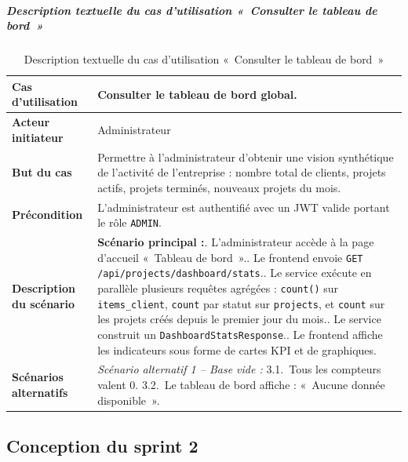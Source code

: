 \subparagraph{Description textuelle du cas d'utilisation «~Consulter le tableau de bord~»}

\begin{table}[H]
  \caption{Description textuelle du cas d'utilisation «~Consulter le tableau de bord~»}
  \label{tab:cu-dashboard}
  \centering
  \begin{tabularx}{\textwidth}{|L{3.8cm}|X|}
    \hline
    \textbf{Cas d'utilisation} & Consulter le tableau de bord global. \\
    \hline
    \textbf{Acteur initiateur} & Administrateur \\
    \hline
    \textbf{But du cas} & Permettre à l'administrateur d'obtenir une vision synthétique de l'activité de l'entreprise : nombre total de clients, projets actifs, projets terminés, nouveaux projets du mois. \\
    \hline
    \textbf{Précondition} & L'administrateur est authentifié avec un JWT valide portant le rôle \texttt{ADMIN}. \\
    \hline
    \textbf{Description du scénario} &
    \textbf{Scénario principal :}. L'administrateur accède à la page d'accueil «~Tableau de bord~».. Le frontend envoie \texttt{GET /api/projects/dashboard/stats}.. Le service exécute en parallèle plusieurs requêtes agrégées :
    \texttt{count()} sur \texttt{items\_client}, \texttt{count} par statut sur \texttt{projects}, et \texttt{count} sur les projets créés depuis le premier jour du mois.. Le service construit un \texttt{DashboardStatsResponse}.. Le frontend affiche les indicateurs sous forme de cartes KPI et de graphiques.\\
    \hline
    \textbf{Scénarios alternatifs} &
    \textit{Scénario alternatif 1 -- Base vide :}\newline
    \hspace*{6pt}3.1.~Tous les compteurs valent 0.\newline
    \hspace*{6pt}3.2.~Le tableau de bord affiche : «~Aucune donnée disponible~».\\
    \hline
  \end{tabularx}
\end{table}

\subsection{Conception du sprint 2}

